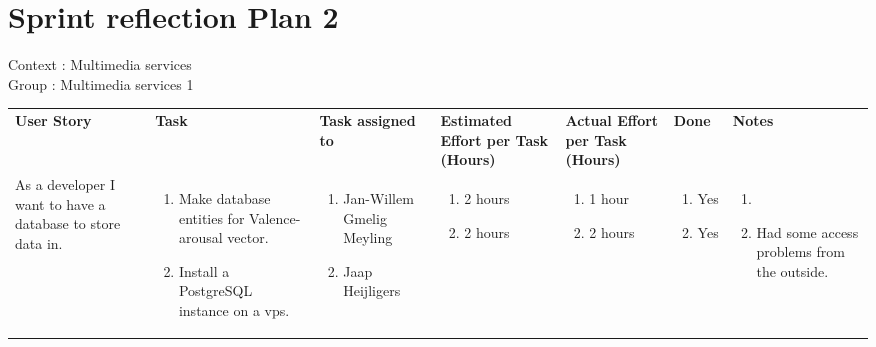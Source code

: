 \documentclass[11pt,a4paper,landscape]{article}
\begin{document}
\section*{Sprint reflection Plan 2}
Context : Multimedia services\\
Group : Multimedia services 1\\



\begin{table}[h]
\begin{tabular}{|p{3cm}|p{5.0cm}|p{3.0cm}|p{2.2cm}|p{2.2cm}|p{2.0cm}|p{5cm}}
\textbf{User Story} & \textbf{Task} & \textbf{Task assigned to} & \textbf{Estimated Effort per Task (Hours)} & \textbf{Actual Effort per Task (Hours)} & \textbf{Done} & \textbf{Notes}\\
As a developer I want to have a database to store data in.

&
\begin{enumerate}
\item Make database entities for Valence-arousal vector. 
\item Install a PostgreSQL instance on a vps.
\end{enumerate}

& 
\begin{enumerate}
\item Jan-Willem Gmelig Meyling
\item Jaap Heijligers
\end{enumerate}

& 
\begin{enumerate}
\item 2 hours
\item 2 hours
\end{enumerate}

&
\begin{enumerate}
\item 1 hour
\item 2 hours
\end{enumerate}

&
\begin{enumerate}
\item Yes
\item Yes
\end{enumerate}

&
\begin{enumerate}
\item 
\item Had some access problems from the outside.
\end{enumerate}
\\


\end{tabular}
\end{table}
\end{document}
